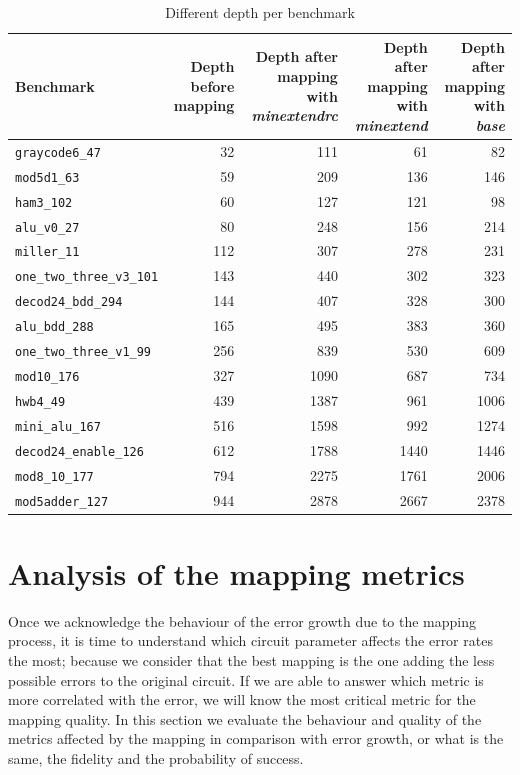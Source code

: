 \begin{table}[htbp]
\caption{\label{tab:depth_per_bench}
Different depth per benchmark}
\centering
\tiny
\begin{tabular}{lrrrr}
\hline
Benchmark & Depth before mapping & Depth after mapping with \emph{minextendrc} & Depth after mapping with \emph{minextend} & Depth after mapping with \emph{base}\\
\hline
\texttt{graycode6\_47} & 32 & 111 & 61 & 82\\
\texttt{mod5d1\_63} & 59 & 209 & 136 & 146\\
\texttt{ham3\_102} & 60 & 127 & 121 & 98\\
\texttt{alu\_v0\_27} & 80 & 248 & 156 & 214\\
\texttt{miller\_11} & 112 & 307 & 278 & 231\\
\texttt{one\_two\_three\_v3\_101} & 143 & 440 & 302 & 323\\
\texttt{decod24\_bdd\_294} & 144 & 407 & 328 & 300\\
\texttt{alu\_bdd\_288} & 165 & 495 & 383 & 360\\
\texttt{one\_two\_three\_v1\_99} & 256 & 839 & 530 & 609\\
\texttt{mod10\_176} & 327 & 1090 & 687 & 734\\
\texttt{hwb4\_49} & 439 & 1387 & 961 & 1006\\
\texttt{mini\_alu\_167} & 516 & 1598 & 992 & 1274\\
\texttt{decod24\_enable\_126} & 612 & 1788 & 1440 & 1446\\
\texttt{mod8\_10\_177} & 794 & 2275 & 1761 & 2006\\
\texttt{mod5adder\_127} & 944 & 2878 & 2667 & 2378\\
\hline
\end{tabular}
\end{table}

\section{Analysis of the mapping metrics}
\label{sec:org790ee7b}
Once we acknowledge the behaviour of the error growth due to the mapping process, it is time to understand which circuit parameter affects the error rates the most; because we consider that the best mapping is the one adding the less possible errors to the original circuit.
If we are able to answer which metric is more correlated with the error, we will know the most critical metric for the mapping quality.
In this section we evaluate the behaviour and quality of the metrics affected by the mapping in comparison with error growth, or what is the same, the fidelity and the probability of success.


